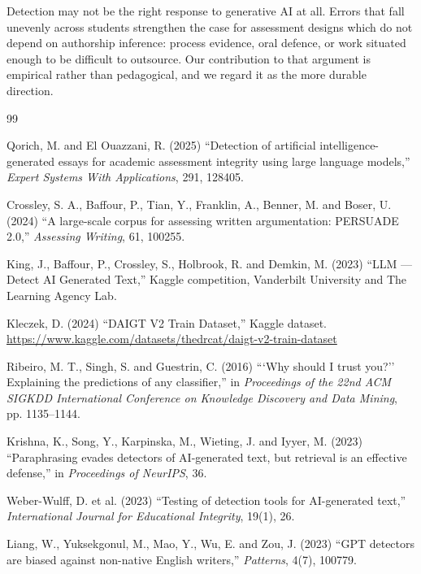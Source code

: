 \documentclass[11pt,a4paper]{article}
\begin{document}
Detection may not be the right response to generative AI at all. Errors
that fall unevenly across students strengthen the case for assessment
designs which do not depend on authorship inference: process evidence,
oral defence, or work situated enough to be difficult to outsource. Our
contribution to that argument is empirical rather than pedagogical, and we
regard it as the more durable direction.

\begin{thebibliography}{99}
\small

 Qorich, M. and El Ouazzani, R. (2025) ``Detection of
artificial intelligence-generated essays for academic assessment integrity
using large language models,'' \emph{Expert Systems With Applications},
291, 128405.

 Crossley, S. A., Baffour, P., Tian, Y., Franklin,
A., Benner, M. and Boser, U. (2024) ``A large-scale corpus for assessing
written argumentation: PERSUADE 2.0,'' \emph{Assessing Writing}, 61,
100255.

 King, J., Baffour, P., Crossley, S., Holbrook, R. and
Demkin, M. (2023) ``LLM --- Detect AI Generated Text,'' Kaggle competition,
Vanderbilt University and The Learning Agency Lab.

 Kleczek, D. (2024) ``DAIGT V2 Train Dataset,'' Kaggle
dataset.
\url{https://www.kaggle.com/datasets/thedrcat/daigt-v2-train-dataset}

 Ribeiro, M. T., Singh, S. and Guestrin, C. (2016)
```Why should I trust you?'' Explaining the predictions of any classifier,''
in \emph{Proceedings of the 22nd ACM SIGKDD International Conference on
Knowledge Discovery and Data Mining}, pp. 1135--1144.

 Krishna, K., Song, Y., Karpinska, M., Wieting, J. and
Iyyer, M. (2023) ``Paraphrasing evades detectors of AI-generated text, but
retrieval is an effective defense,'' in \emph{Proceedings of NeurIPS}, 36.

 Weber-Wulff, D. et al. (2023) ``Testing of
detection tools for AI-generated text,'' \emph{International Journal for
Educational Integrity}, 19(1), 26.

 Liang, W., Yuksekgonul, M., Mao, Y., Wu, E. and Zou, J.
(2023) ``GPT detectors are biased against non-native English writers,''
\emph{Patterns}, 4(7), 100779.


\end{thebibliography}
\end{document}
